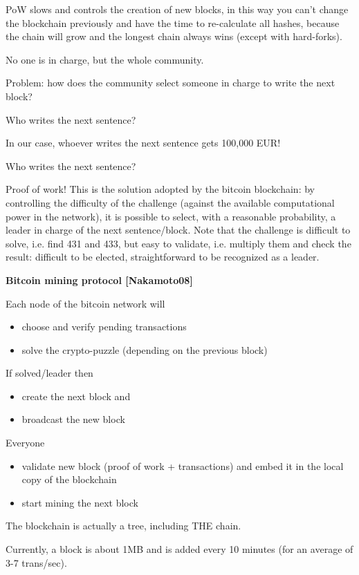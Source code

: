 PoW slows and controls the creation of new blocks, in this way you can't change the blockchain previously and have the time to re-calculate all hashes, because the chain will grow and the longest chain always wins (except with hard-forks).

No one is in charge, but the whole community.

Problem: how does the community select someone in charge to write the next block?

Who writes the next sentence?

In our case, whoever writes the next sentence gets 100,000 EUR!

Who writes the next sentence?

Proof of work! This is the solution adopted by the bitcoin blockchain: by controlling the difficulty of the challenge (against the available computational power in the network), it is possible to select, with a reasonable probability, a leader in charge of the next sentence/block. Note that the challenge is difficult to solve, i.e. find 431 and 433, but easy to validate, i.e. multiply them and check the result: difficult to be elected, straightforward to be recognized as a leader.

\textbf{Bitcoin mining protocol [Nakamoto08]}

Each node of the bitcoin network will
\begin{itemize}
	\item choose and verify pending transactions
	\item solve the crypto-puzzle (depending on the previous block)
\end{itemize}

If solved/leader then
\begin{itemize}
	\item create the next block and
	\item broadcast the new block
\end{itemize}

Everyone
\begin{itemize}
	\item validate new block (proof of work + transactions) and embed it in the local copy of the blockchain
	\item start mining the next block
\end{itemize}

The blockchain is actually a tree, including THE chain.

Currently, a block is about 1MB and is added every 10 minutes (for an average of 3-7 trans/sec).

